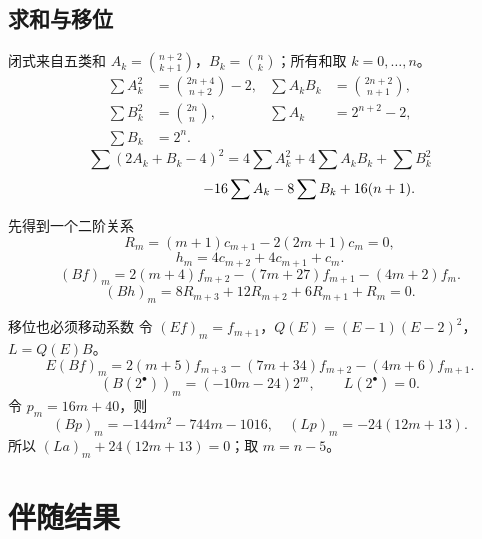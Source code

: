 \documentclass{beamer}
\begin{document}
\subsection{求和与移位}
\begin{frame}{闭式来自五类和}
\small
$A_k=\binom{n+2}{k+1}$，$B_k=\binom nk$；所有和取 $k=0,\ldots,n$。
\[
\begin{aligned}
\sum A_k^2&=\binom{2n+4}{n+2}-2,&\sum A_kB_k&=\binom{2n+2}{n+1},\\
\sum B_k^2&=\binom{2n}n,&\sum A_k&=2^{n+2}-2,\\
\sum B_k&=2^n.
\end{aligned}
\]
\[
\sum(2A_k+B_k-4)^2
=4\sum A_k^2+4\sum A_kB_k+\sum B_k^2
\]
\[
\hspace{25mm}-16\sum A_k-8\sum B_k+16(n+1).
\]
\end{frame}
\begin{frame}{先得到一个二阶关系}
\small
\[
R_m=(m+1)c_{m+1}-2(2m+1)c_m=0,
\]
\[
h_m=4c_{m+2}+4c_{m+1}+c_m.
\]
\[
(Bf)_m=2(m+4)f_{m+2}-(7m+27)f_{m+1}-(4m+2)f_m.
\]
\[
(Bh)_m=8R_{m+3}+12R_{m+2}+6R_{m+1}+R_m=0.
\]
\end{frame}
\begin{frame}{移位也必须移动系数}
\small
令 $(Ef)_m=f_{m+1}$，$Q(E)=(E-1)(E-2)^2$，$L=Q(E)B$。
\[
E(Bf)_m=2(m+5)f_{m+3}-(7m+34)f_{m+2}-(4m+6)f_{m+1}.
\]
\[
(B(2^\bullet))_m=(-10m-24)2^m,\qquad L(2^\bullet)=0.
\]
令 $p_m=16m+40$，则
\[
(Bp)_m=-144m^2-744m-1016,\quad (Lp)_m=-24(12m+13).
\]
所以 $(La)_m+24(12m+13)=0$；取 $m=n-5$。
\end{frame}
\section{伴随结果}
\end{document}

